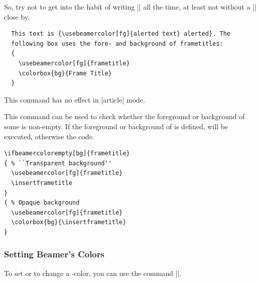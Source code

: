 \begin{command}{\usebeamercolor\opt{|*|}}
  So, try not to get into the habit of writing |\color{structure.fg}| all the time, at least not without a || close by.

  \example
\begin{verbatim}
  This text is {\usebeamercolor[fg]{alerted text} alerted}. The
  following box uses the fore- and background of frametitles:
  {
    \usebeamercolor[fg]{frametitle}
    \colorbox{bg}{Frame Title}
  }
\end{verbatim}

  \articlenote
  This command has no effect in |article| mode.
\end{command}


\begin{command}{\ifbeamercolorempty{}}
  This command can be used to check whether the foreground or background of some  is non-empty. If the foreground or background of  is defined,  will be executed, otherwise the  code.

  \example
\begin{verbatim}
\ifbeamercolorempty[bg]{frametitle}
{ % ``Transparent background''
  \usebeamercolor[fg]{frametitle}
  \insertframetitle
}
{ % Opaque background
  \usebeamercolor[fg]{frametitle}
  \colorbox{bg}{\insertframetitle}
}
\end{verbatim}
\end{command}

\subsubsection{Setting Beamer's Colors}

To set or to change a \beamer-color, you can use the command |\setbeamercolor|.

